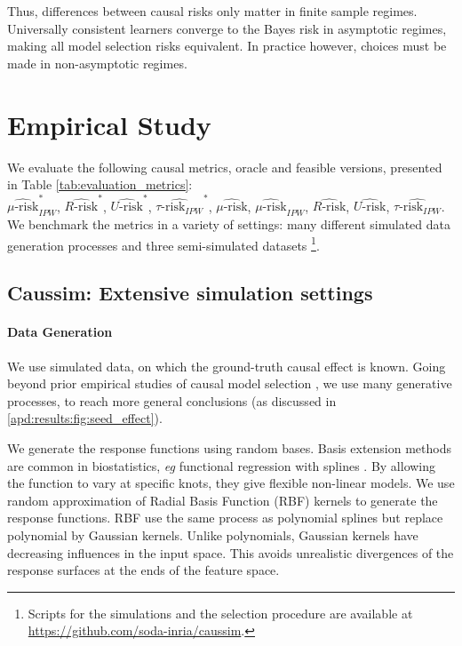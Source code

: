 \documentclass{report}
\begin{document}
Thus, differences between causal risks only matter in finite sample regimes.
Universally consistent learners converge to the Bayes risk in asymptotic
regimes, making all model selection risks equivalent. In practice however,
choices must be made in non-asymptotic regimes.



\section{Empirical Study}\label{sec:empirical_study}


We evaluate the following causal metrics, oracle and feasible
versions, presented in Table
\ref{tab:evaluation_metrics}:\\
$\widehat{\mu\text{-risk}}_{IPW}^*$,
$\widehat{R\text{-risk}}^*$,
$\widehat{U\text{-risk}}^*$,
$\widehat{\tau\text{-risk}_{IPW}}^*$,
$\widehat{\mu\text{-risk}}$,
$\widehat{\mu\text{-risk}}_{IPW}$,
$\widehat{R\text{-risk}}$,
$\widehat{U\text{-risk}}$,
$\widehat{\tau\text{-risk}_{IPW}}$.
We benchmark the metrics in a variety of settings:
many different simulated data generation
processes and three semi-simulated datasets \footnote{Scripts for the simulations and the selection procedure are available at
  \url{https://github.com/soda-inria/caussim}.
}.

\subsection{Caussim: Extensive simulation settings}\label{subsec:simulations}

\paragraph{Data Generation}

We use simulated data, on which the ground-truth causal effect is known. Going
beyond prior empirical studies of causal model selection
\citep{schuler_comparison_2018,alaa_validating_2019}, we use many
generative processes, to reach more general conclusions (as discussed
in \ref{apd:results:fig:seed_effect}).

We generate the response functions using random bases. Basis extension methods
are common in biostatistics, \emph{eg} functional regression with splines
\citep{howe_splines_2011, perperoglou_review_2019}. By allowing the function to
vary at specific knots, they give flexible non-linear models. We use random approximation of Radial Basis Function (RBF) kernels
\citep{rahimi_random_2008} to generate the response functions. RBF use the same
process as polynomial splines but replace polynomial by Gaussian kernels. Unlike
polynomials, Gaussian kernels have decreasing influences in the input space.
This avoids unrealistic divergences of the response surfaces at the
ends of the feature space.
\end{document}
